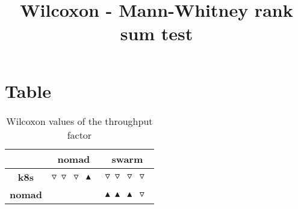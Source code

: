 \documentclass{article}
\title{Wilcoxon - Mann-Whitney rank sum test}
\author{}
\begin{document}
\maketitle
\section{Table}
\begin{table}[!htp]
  \caption{Wilcoxon values of the throughput factor}
  \label{table:throughput}
  \centering
  \begin{scriptsize}
  \begin{tabular}{c|cc}
      & \textbf{nomad} & \textbf{swarm} \\\hline
      \textbf{k8s} & $\triangledown\ \triangledown\ \triangledown\ \blacktriangle\  $ & $ \triangledown\ \triangledown\ \triangledown\ \triangledown\ $ \\
      \textbf{nomad} & $ $ & $ \blacktriangle\ \blacktriangle\ \blacktriangle\ \triangledown\ $ \\
  \end{tabular}
  \end{scriptsize}
\end{table}
\end{document}
